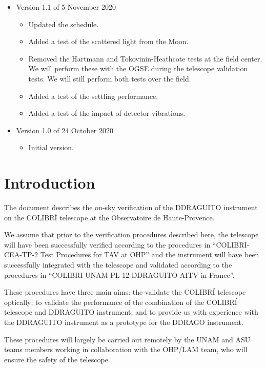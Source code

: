 \documentclass{article}
\begin{document}
\begin{itemize}
\item Version 1.1 of 5 November 2020
\begin{itemize}
    \item Updated the schedule.
    \item Added a test of the scattered light from the Moon.
    \item Removed the Hartmann and Tokovinin-Heathcote tests at the field center. We will perform these with the OGSE during the telescope validation tests. We will still perform both tests over the field.
    \item Added a test of the settling performance.
    \item Added a test of the impact of detector vibrations.
\end{itemize}

\item Version 1.0 of 24 October 2020
\begin{itemize}
    \item Initial version.
\end{itemize}
\end{itemize}
\clearpage


\section{Introduction}

The document describes the on-sky verification of the DDRAGUITO instrument on the COLIBRÍ telescope at the Observatoire de Haute-Provence.

We assume that prior to the verification procedures described here, the telescope will have been successfully verified according to the procedures in “COLIBRI-CEA-TP-2 Test Procedures for TAV at OHP” and the instrument will have been successfully integrated with the telescope and validated according to the procedures in “COLIBRI-UNAM-PL-12 DDRAGUITO AITV in France”.

These procedures have three main aims: the validate the COLIBRÍ telescope optically; to validate the performance of the combination of the COLIBRÍ telescope and DDRAGUITO instrument; and to provide us with experience with the DDRAGUITO instrument as a prototype for the DDRAGO instrument.

These procedures will largely be carried out remotely by the UNAM and ASU teams members working in collaboration with the OHP/LAM team, who will ensure the safety of the telescope. 
\end{document}
